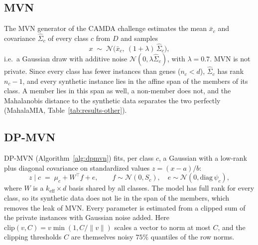 \documentclass{article}
\newcommand{\dpmvn}{DP-MVN}
\begin{document}
\subsection{MVN}
The MVN generator of the CAMDA challenge estimates the mean $\bar x_c$ and covariance $\hat\Sigma_c$ of every class $c$ from $D$ and samples
\begin{equation}
  x \;\sim\; \mathcal{N}\big(\bar x_c,\ (1+\lambda)\,\hat\Sigma_c\big),
  \label{eq:mvn}
\end{equation}
i.e.\ a Gaussian draw with additive noise $\mathcal{N}(0,\lambda\hat\Sigma_c)$, with $\lambda=0.7$. MVN is not private. Since every class has fewer instances than genes ($n_c<d$), $\hat\Sigma_c$ has rank $n_c-1$, and every synthetic instance lies in the affine span of the members of its class. A member lies in this span as well, a non-member does not, and the Mahalanobis distance to the synthetic data separates the two perfectly (MahalaMIA, Table~\ref{tab:results-other}).

\subsection{\dpmvn{}}
\dpmvn{} (Algorithm~\ref{alg:dpmvn}) fits, per class $c$, a Gaussian with a low-rank plus diagonal covariance on standardized values $z=(x-a)/b$:
\begin{equation}
  z \mid c \;=\; \mu_c + W^\top f + e, \qquad f\sim\mathcal N(0,S_c),\quad e\sim\mathcal N(0,\mathrm{diag}\,\psi_c),
  \label{eq:dpmvn-model}
\end{equation}
where $W$ is a $k_\mathrm{eff}\times d$ basis shared by all classes. The model has full rank for every class, so its synthetic data does not lie in the span of the members, which removes the leak of MVN. Every parameter is estimated from a clipped sum of the private instances with Gaussian noise added. Here $\mathrm{clip}(v, C) = v\min(1, C/\lVert v\rVert)$ scales a vector to norm at most $C$, and the clipping thresholds $C$ are themselves noisy $75\%$ quantiles of the row norms.
\end{document}
